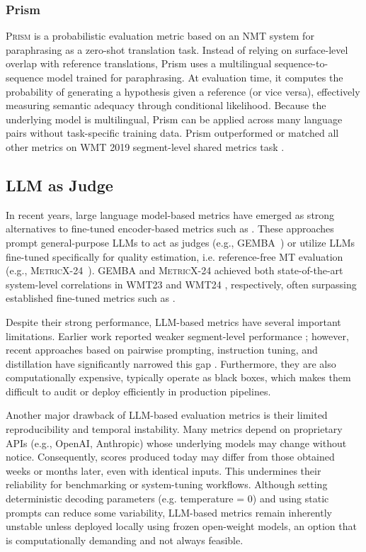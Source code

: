 \subsubsection{Prism}
\textsc{Prism} \citep{prism} is a probabilistic evaluation metric based on an NMT system for paraphrasing as a zero-shot translation task. Instead of relying on surface-level overlap with reference translations, Prism uses a multilingual sequence-to-sequence model trained for paraphrasing. At evaluation time, it computes the probability of generating a hypothesis given a reference (or vice versa), effectively measuring semantic adequacy through conditional likelihood. Because the underlying model is multilingual, Prism can be applied across many language pairs without task-specific training data. Prism outperformed or matched all other metrics on WMT 2019 segment-level shared metrics task \citep{prism}.


\subsection{LLM as Judge}
In recent years, large language model-based metrics have emerged as strong alternatives to fine-tuned encoder-based metrics such as \comet. These approaches prompt general-purpose LLMs to act as judges (e.g., \textsc{GEMBA}~\citep{kocmi-federmann-2023-gemba}) or utilize LLMs fine-tuned specifically for quality estimation, i.e. reference-free MT evaluation (e.g., \textsc{MetricX-24}~\citep{juraska-etal-2024-metricx}). \textsc{GEMBA} and \textsc{MetricX-24} achieved both state-of-the-art system-level correlations in WMT23 \citep{kocmi-etal-2023-findings} and WMT24 \citep{kocmi-etal-2024-findings}, respectively, often surpassing established fine-tuned metrics such as \comet.

Despite their strong performance, LLM-based metrics have several important limitations. Earlier work reported weaker segment-level performance \citep{kocmi-federmann-2023-large,fernandes-etal-2023-devil}; however, recent approaches based on pairwise prompting, instruction tuning, and distillation have significantly narrowed this gap \citep{kocmi-etal-2024-navigating, tan-monz-2025-remedy}. Furthermore, they are also computationally expensive, typically operate as black boxes, which makes them difficult to audit or deploy efficiently in production pipelines.

Another major drawback of LLM-based evaluation metrics is their limited reproducibility and temporal instability. Many metrics depend on proprietary APIs (e.g., OpenAI, Anthropic) whose underlying models may change without notice. Consequently, scores produced today may differ from those obtained weeks or months later, even with identical inputs. This undermines their reliability for benchmarking or system-tuning workflows. Although setting deterministic decoding parameters (e.g. temperature = 0) and using static prompts can reduce some variability, LLM-based metrics remain inherently unstable unless deployed locally using frozen open-weight models, an option that is computationally demanding and not always feasible.

